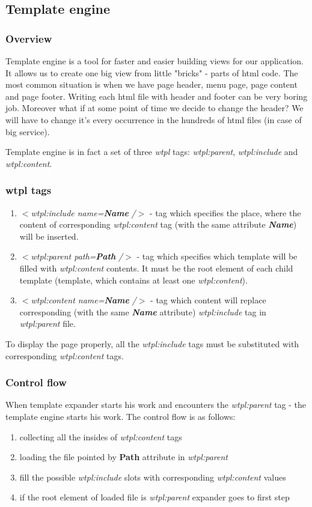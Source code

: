 \subsection{Template engine}
\subsubsection{Overview}Template engine is a tool for faster and easier building views for our application. 
It allows us to create one big view from little "bricks" - parts of html code. 
The most common situation is when we have page header, menu page, page content and page footer. 
Writing each html file with header and footer can be very boring job. 
Moreover what if at some point of time we decide to change the header? 
We will have to change it's every occurrence in the hundreds of html files (in case of big service).

Template engine is in fact a set of three {\it wtpl} tags: {\it wtpl:parent}, {\it wtpl:include} and {\it wtpl:content}.

\subsubsection{wtpl tags}
\begin{enumerate}
\item {\it $<$wtpl:include name=}{\bf {\em Name}} {\it /$>$} - tag which specifies the place, where the content of corresponding {\it wtpl:content} tag 
(with the same attribute {\bf {\em Name}}) will be inserted. 
\item {\it $<$wtpl:parent path=}{\bf {\em Path}} {\it /$>$} - tag which specifies which template will be filled with {\it wtpl:content} contents. 
It must be the root element of each child template (template, which contains at least one {\it wtpl:content}).
\item {\it $<$wtpl:content name=}{\bf {\em Name}} {\it /$>$} - tag which content will replace corresponding (with the same {\bf {\em Name}} attribute)
 {\it wtpl:include} tag in {\it wtpl:parent} file.
\end{enumerate}
To display the page properly, all the {\it wtpl:include} tags must be substituted with corresponding {\it wtpl:content} tags.

\subsubsection{Control flow}When template expander starts his work and encounters the {\it wtpl:parent} tag - the template engine starts his work. 
The control flow is as follows:
\begin{enumerate}
\item collecting all the insides of {\it wtpl:content} tags
\item loading the file pointed by {\bf Path} attribute in {\it wtpl:parent}
\item fill the possible {\it wtpl:include} slots with corresponding {\it wtpl:content} values
\item if the root element of loaded file is {\it wtpl:parent} expander goes to first step
\end{enumerate} 

